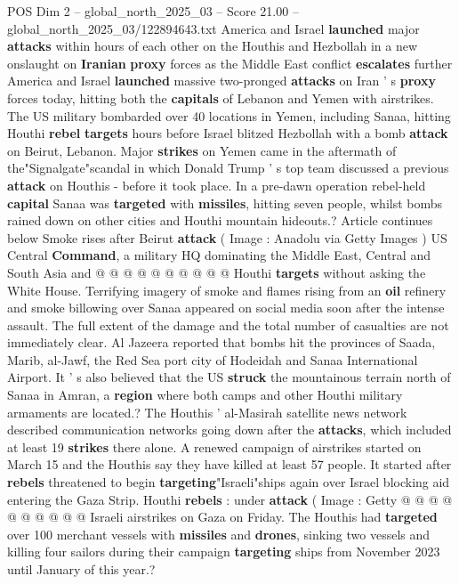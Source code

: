 \begin{textsample}{POS Dim 2 – global\_north\_2025\_03 – Score 21.00 – global\_north\_2025\_03/122894643.txt}  \label{ex:f2_pos_413}
America and Israel \textbf{launched} major \textbf{attacks} within hours of each other on the Houthis and Hezbollah in a new onslaught on \textbf{Iranian} \textbf{proxy} forces as the Middle East conflict \textbf{escalates} further America and Israel \textbf{launched} massive two-pronged \textbf{attacks} on Iran ' s \textbf{proxy} forces today, hitting both the \textbf{capitals} of Lebanon and Yemen with airstrikes.
The US military bombarded over 40 locations in Yemen, including Sanaa, hitting Houthi \textbf{rebel} \textbf{targets} hours before Israel blitzed Hezbollah with a bomb \textbf{attack} on Beirut, Lebanon.
Major \textbf{strikes} on Yemen came in the aftermath of the"Signalgate"scandal in which Donald Trump ' s top team discussed a previous \textbf{attack} on Houthis - before it took place.
In a pre-dawn operation rebel-held \textbf{capital} Sanaa was \textbf{targeted} with \textbf{missiles}, hitting seven people, whilst bombs rained down on other cities and Houthi mountain hideouts.?
Article continues below Smoke rises after Beirut \textbf{attack} ( Image : Anadolu via Getty Images ) US Central \textbf{Command}, a military HQ dominating the Middle East, Central and South Asia and @ @ @ @ @ @ @ @ @ @ Houthi \textbf{targets} without asking the White House.
Terrifying imagery of smoke and flames rising from an \textbf{oil} refinery and smoke billowing over Sanaa appeared on social media soon after the intense assault.
The full extent of the damage and the total number of casualties are not immediately clear.
Al Jazeera reported that bombs hit the provinces of Saada, Marib, al-Jawf, the Red Sea port city of Hodeidah and Sanaa International Airport.
It ' s also believed that the US \textbf{struck} the mountainous terrain north of Sanaa in Amran, a \textbf{region} where both camps and other Houthi military armaments are located.?
The Houthis ' al-Masirah satellite news network described communication networks going down after the \textbf{attacks}, which included at least 19 \textbf{strikes} there alone.
A renewed campaign of airstrikes started on March 15 and the Houthis say they have killed at least 57 people.
It started after \textbf{rebels} threatened to begin \textbf{targeting}"Israeli"ships again over Israel blocking aid entering the Gaza Strip.
Houthi \textbf{rebels} : under \textbf{attack} ( Image : Getty @ @ @ @ @ @ @ @ @ @ Israeli airstrikes on Gaza on Friday.
The Houthis had \textbf{targeted} over 100 merchant vessels with \textbf{missiles} and \textbf{drones}, sinking two vessels and killing four sailors during their campaign \textbf{targeting} ships from November 2023 until January of this year.?

\end{textsample}
